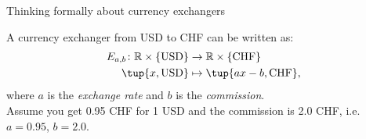 \begin{frame}[fragile]{Thinking formally about currency exchangers}
\begin{center}
\end{center}
A currency exchanger from USD to CHF can be written as:
    \begin{equation*}
        \begin{aligned}
            E_{a,b}\colon \mathbb{R}\times \{\text{USD}\} &\to \mathbb{R}\times \{\text{CHF}\}\\
            \tup{x,\text{USD}}&\mapsto \tup{ax-b,\text{CHF}},
        \end{aligned}
    \end{equation*}
where $a$ is the \emph{exchange rate} and $b$ is the \emph{commission}.\\
\vspace{0.5cm}
Assume you get 0.95 CHF for 1 USD and the commission is 2.0 CHF, i.e. $a=0.95$, $b=2.0$.
\end{frame}

